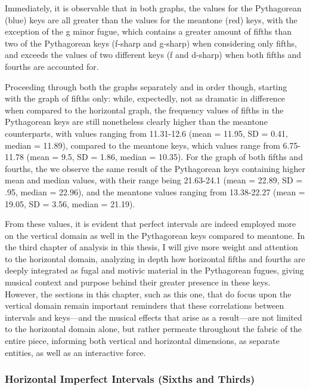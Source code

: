    \begin{center}
    \end{center}
    
    Immediately, it is observable that in both graphs, the values for the
Pythagorean (blue) keys are all greater than the values for the meantone
(red) keys, with the exception of the g minor fugue, which contains a
greater amount of fifths than two of the Pythagorean keys (f-sharp and
g-sharp) when considering only fifths, and exceeds the values of two
different keys (f and d-sharp) when both fifths and fourths are
accounted for.

Proceeding through both the graphs separately and in order though,
starting with the graph of fifths only: while, expectedly, not as
dramatic in difference when compared to the horizontal graph, the
frequency values of fifths in the Pythagorean keys are still nonetheless
clearly higher than the meantone counterparts, with values ranging from
11.31-12.6 (mean = 11.95, SD = 0.41, median = 11.89), compared to the
meantone keys, which values range from 6.75-11.78 (mean = 9.5, SD =
1.86, median = 10.35). For the graph of both fifths and fourths, the we
observe the same result of the Pythagorean keys containing higher mean
and median values, with their range being 21.63-24.1 (mean = 22.89, SD =
.95, median = 22.96), and the meantone values ranging from 13.38-22.27
(mean = 19.05, SD = 3.56, median = 21.19).

From these values, it is evident that perfect intervals are indeed
employed more on the vertical domain as well in the Pythagorean keys
compared to meantone. In the third chapter of analysis in this thesis, I
will give more weight and attention to the horizontal domain, analyzing
in depth how horizontal fifths and fourths are deeply integrated as
fugal and motivic material in the Pythagorean fugues, giving musical
context and purpose behind their greater presence in these keys.
However, the sections in this chapter, such as this one, that do focus
upon the vertical domain remain important reminders that these
correlations between intervals and keys---and the musical effects
that arise as a result---are not limited to the horizontal domain
alone, but rather permeate throughout the fabric of the entire piece,
informing both vertical and horizontal dimensions, as separate entities,
as well as an interactive force.

    \subsubsection{Horizontal Imperfect Intervals (Sixths and
Thirds)}\label{horizontal-imperfect-intervals-sixths-and-thirds}

